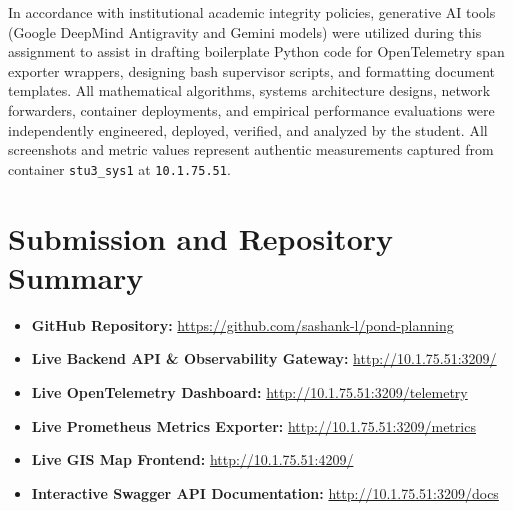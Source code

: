 \documentclass[manuscript,screen]{acmart}
\begin{document}
In accordance with institutional academic integrity policies, generative AI tools (Google DeepMind Antigravity and Gemini models) were utilized during this assignment to assist in drafting boilerplate Python code for OpenTelemetry span exporter wrappers, designing bash supervisor scripts, and formatting document templates. All mathematical algorithms, systems architecture designs, network forwarders, container deployments, and empirical performance evaluations were independently engineered, deployed, verified, and analyzed by the student. All screenshots and metric values represent authentic measurements captured from container \texttt{stu3\_sys1} at \texttt{10.1.75.51}.

\section{Submission and Repository Summary}
\label{sec:submission}

\begin{itemize}
  \item \textbf{GitHub Repository:} \url{https://github.com/sashank-l/pond-planning}
  \item \textbf{Live Backend API \& Observability Gateway:} \url{http://10.1.75.51:3209/}
  \item \textbf{Live OpenTelemetry Dashboard:} \url{http://10.1.75.51:3209/telemetry}
  \item \textbf{Live Prometheus Metrics Exporter:} \url{http://10.1.75.51:3209/metrics}
  \item \textbf{Live GIS Map Frontend:} \url{http://10.1.75.51:4209/}
  \item \textbf{Interactive Swagger API Documentation:} \url{http://10.1.75.51:3209/docs}
\end{itemize}
\end{document}
